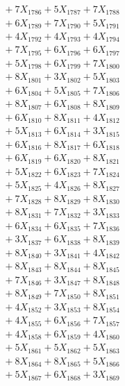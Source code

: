 \documentclass[a4paper,10pt]{article}
\begin{document}
{\begin{align}
&\;  + 7 X_{1786} + 5 X_{1787} + 7 X_{1788} \\[0.3ex]
&\;  + 6 X_{1789} + 7 X_{1790} + 5 X_{1791} \\[0.3ex]
&\;  + 4 X_{1792} + 4 X_{1793} + 4 X_{1794} \\[0.3ex]
&\;  + 7 X_{1795} + 6 X_{1796} + 6 X_{1797} \\[0.3ex]
&\;  + 5 X_{1798} + 6 X_{1799} + 7 X_{1800} \\[0.3ex]
&\;  + 8 X_{1801} + 3 X_{1802} + 5 X_{1803} \\[0.3ex]
&\;  + 6 X_{1804} + 5 X_{1805} + 7 X_{1806} \\[0.3ex]
&\;  + 8 X_{1807} + 6 X_{1808} + 8 X_{1809} \\[0.5ex]\allowbreak
&\;  + 6 X_{1810} + 8 X_{1811} + 4 X_{1812} \\[0.3ex]
&\;  + 5 X_{1813} + 6 X_{1814} + 3 X_{1815} \\[0.3ex]
&\;  + 6 X_{1816} + 8 X_{1817} + 6 X_{1818} \\[0.3ex]
&\;  + 6 X_{1819} + 6 X_{1820} + 8 X_{1821} \\[0.3ex]
&\;  + 5 X_{1822} + 6 X_{1823} + 7 X_{1824} \\[0.3ex]
&\;  + 5 X_{1825} + 4 X_{1826} + 8 X_{1827} \\[0.3ex]
&\;  + 7 X_{1828} + 8 X_{1829} + 8 X_{1830} \\[0.3ex]
&\;  + 8 X_{1831} + 7 X_{1832} + 3 X_{1833} \\[0.3ex]
&\;  + 6 X_{1834} + 6 X_{1835} + 7 X_{1836} \\[0.3ex]
&\;  + 3 X_{1837} + 6 X_{1838} + 8 X_{1839} \\[0.5ex]\allowbreak
&\;  + 8 X_{1840} + 3 X_{1841} + 4 X_{1842} \\[0.3ex]
&\;  + 8 X_{1843} + 8 X_{1844} + 8 X_{1845} \\[0.3ex]
&\;  + 7 X_{1846} + 3 X_{1847} + 8 X_{1848} \\[0.3ex]
&\;  + 8 X_{1849} + 7 X_{1850} + 8 X_{1851} \\[0.3ex]
&\;  + 4 X_{1852} + 3 X_{1853} + 8 X_{1854} \\[0.3ex]
&\;  + 4 X_{1855} + 6 X_{1856} + 7 X_{1857} \\[0.3ex]
&\;  + 4 X_{1858} + 6 X_{1859} + 4 X_{1860} \\[0.3ex]
&\;  + 5 X_{1861} + 5 X_{1862} + 5 X_{1863} \\[0.3ex]
&\;  + 8 X_{1864} + 8 X_{1865} + 5 X_{1866} \\[0.3ex]
&\;  + 5 X_{1867} + 6 X_{1868} + 3 X_{1869} \\[0.5ex]\allowbreak

\end{align}}
\end{document}
